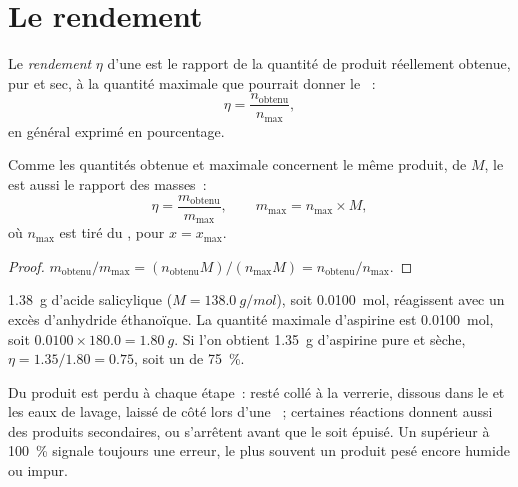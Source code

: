 \section{Le rendement}

\begin{definition}[Rendement]\label{def:g10:synthesis-yield:yield}
Le \emph{rendement} $\eta$ d'une  est le
rapport de la quantité de produit réellement obtenue, pur et sec, à la
quantité maximale que pourrait donner le ~:
\[
  \eta = \frac{n_{\text{obtenu}}}{n_{\max}} ,
\]
en général exprimé en pourcentage.
\end{definition}

\begin{proposition}\label{prop:g10:synthesis-yield:masses}
Comme les quantités obtenue et maximale concernent le même produit, de
 $M$, le  est aussi le rapport des masses~:
\[
  \eta = \frac{m_{\text{obtenu}}}{m_{\max}},
  \qquad m_{\max} = n_{\max} \times M,
\]
où $n_{\max}$ est tiré du , pour $x = x_{\max}$.
\end{proposition}

\begin{proof}
$m_{\text{obtenu}} / m_{\max} = (n_{\text{obtenu}} M) / (n_{\max} M)
= n_{\text{obtenu}} / n_{\max}$.
\end{proof}

\begin{example}\label{ex:g10:synthesis-yield:small}
\qty{1.38}{g} d'acide salicylique ($M = \qty{138.0}{g/mol}$), soit
\qty{0.0100}{mol}, réagissent avec un excès d'anhydride éthanoïque. La
quantité maximale d'aspirine est \qty{0.0100}{mol}, soit
$0.0100 \times 180.0 = \qty{1.80}{g}$. Si l'on obtient \qty{1.35}{g}
d'aspirine pure et sèche, $\eta = 1.35 / 1.80 = 0.75$, soit un 
de \qty{75}{\percent}.
\end{example}

\begin{remark}\label{rem:g10:synthesis-yield:below}
Du produit est perdu à chaque étape~: resté collé à la verrerie, dissous
dans le  et les eaux de lavage, laissé de côté lors d'une
~; certaines réactions donnent aussi des produits
secondaires, ou s'arrêtent avant que le  soit épuisé. Un
 supérieur à \qty{100}{\percent} signale toujours une erreur, le
plus souvent un produit pesé encore humide ou impur.
\end{remark}

